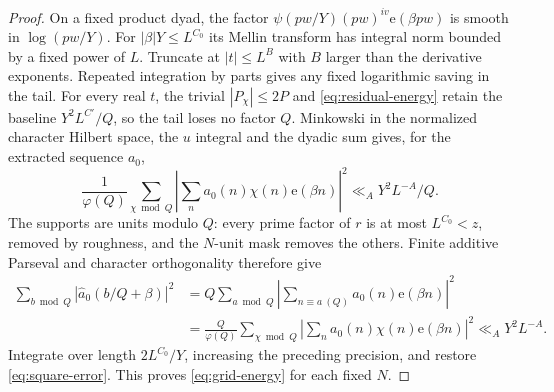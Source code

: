 \documentclass[11pt]{article}
\theoremstyle{definition}
\newcommand{\e}{\mathrm e}
\theoremstyle{remark}
\begin{document}
\begin{proof}
On a fixed product dyad, the factor
$\psi(pw/Y)(pw)^{iv}\e(\beta pw)$ is smooth in $\log(pw/Y)$.
For $|\beta|Y\le L^{C_0}$ its Mellin transform has integral norm
bounded by a fixed power of $L$.
Truncate at $|t|\le L^B$ with $B$ larger than the derivative exponents.
Repeated integration by parts gives any fixed logarithmic saving
in the tail. For every real $t$, the trivial $|P_\chi|\le2P$
and \eqref{eq:residual-energy} retain the baseline
$Y^2L^{C'}/Q$, so the tail loses no factor $Q$.
Minkowski in the normalized character Hilbert space, the $u$ integral
and the dyadic sum gives, for the extracted sequence $a_0$,
\begin{equation}\label{eq:full-character-energy}
\frac1{\varphi(Q)}\sum_{\chi\bmod Q}
 \left|\sum_na_0(n)\chi(n)\e(\beta n)\right|^2
\ll_A Y^2L^{-A}/Q.
\end{equation}
The supports are units modulo $Q$: every prime factor of $r$
is at most $L^{C_0}<z$, removed by roughness, and the $N$-unit mask
removes the others. Finite additive Parseval and character
orthogonality therefore give
\begin{equation}\label{eq:additive-character-parseval}
\begin{split}
\sum_{b\bmod Q}|\widehat a_0(b/Q+\beta)|^2
&=Q\sum_{a\bmod Q}
  \left|\sum_{n\equiv a\ (Q)}a_0(n)\e(\beta n)\right|^2\\
&=\frac Q{\varphi(Q)}
  \sum_{\chi\bmod Q}
  \left|\sum_na_0(n)\chi(n)\e(\beta n)\right|^2
 \ll_A Y^2L^{-A}.
\end{split}
\end{equation}
Integrate over length $2L^{C_0}/Y$, increasing the preceding precision,
and restore \eqref{eq:square-error}. This proves
\eqref{eq:grid-energy} for each fixed $N$.
\end{proof}
\end{document}
